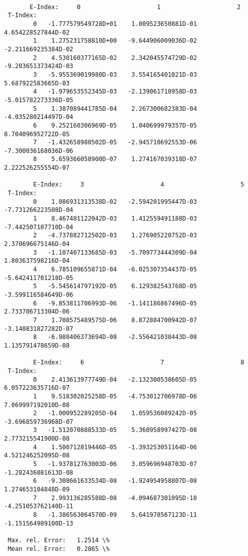 \documentclass[12pt,dvipdfmx]{article}
\begin{document}
{\begin{small}\begin{verbatim}

       E-Index:     0                     1                     2
 T-Index:
        0   -1.777579549728D+01    1.009523650881D-01    4.654228527844D-02
        1    1.275231758810D+00   -9.644906009036D-02   -2.211669235384D-02
        2    4.530160377165D-02    2.342045574729D-02   -9.203651373424D-03
        3   -5.955369019980D-03    3.554165401021D-03    5.687922583665D-03
        4   -1.979653552345D-03   -2.139061718958D-03   -5.015782273336D-05
        5    1.387089441785D-04    2.267300682383D-04   -4.035280214497D-04
        6    9.252160306969D-05    1.040699979357D-05    8.704096952722D-05
        7   -1.432658980502D-05   -2.945710692553D-06   -7.300036168036D-06
        8    5.659366058900D-07    1.274167039318D-07    2.222526255554D-07

        E-Index:     3                     4                     5
 T-Index:
        0    1.086931313538D-02   -2.594201995447D-03   -7.731266223508D-04
        1    8.467481122042D-03    1.412559491188D-03   -7.442507107710D-04
        2   -4.737882712502D-03    1.276905220752D-03    2.370696675146D-04
        3   -1.107407133685D-03   -5.709773444309D-04    1.803637598216D-04
        4    6.785109655871D-04   -6.025307354437D-05   -5.642411701218D-05
        5   -5.545614797192D-05    6.129382543768D-05   -3.599116584649D-06
        6   -9.853811706993D-06   -1.141186867496D-05    2.733706713304D-06
        7    1.708575489575D-06    8.872884700942D-07   -3.140831827282D-07
        8   -6.988406373694D-08   -2.556421038443D-08    1.135791478659D-08

        E-Index:     6                     7                     8
 T-Index:
        0    2.413613977749D-04   -2.132300538605D-05    6.057223635716D-07
        1    9.518302025258D-05   -4.753012706978D-06    7.069997192010D-08
        2   -1.000952289205D-04    1.059536089242D-05   -3.696859736968D-07
        3   -1.512070888533D-05    5.360958997427D-08    2.773215541900D-08
        4    1.500712819446D-05   -1.393253051164D-06    4.521246252095D-08
        5   -1.937812763003D-06    3.059696948703D-07   -1.282436081613D-08
        6   -9.308661633534D-08   -1.924954958807D-08    1.274653104848D-09
        7    2.993136285588D-08   -4.094687301095D-10   -4.251053762140D-11
        8   -1.386563064570D-09    5.641978567123D-11   -1.151564989100D-13

 Max. rel. Error:   1.2514 \%
 Mean rel. Error:   0.2865 \%
\end{verbatim}\end{small}

}
\end{document}
